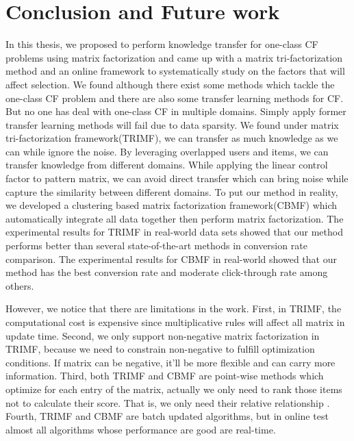 \chapter{Conclusion and Future work}
\label{chp:conclusion}

In this thesis, we proposed to perform knowledge transfer for one-class CF problems using matrix factorization and came up with a matrix tri-factorization method and an online framework to systematically study on the factors that will affect selection.
We found although there exist some methods which tackle the one-class CF problem and there are also some transfer learning methods for CF. But no one has deal with one-class CF in multiple domains. Simply apply former transfer learning methods will fail due to data sparsity. 
We found under matrix tri-factorization framework(TRIMF), we can transfer as much knowledge as we can while ignore the noise. 
By leveraging overlapped users and items, we can transfer knowledge from different domains. While applying the linear control factor to pattern matrix, we can avoid direct transfer which can bring noise while capture the similarity between different domains.
To put our method in reality, we developed a clustering based matrix factorization framework(CBMF) which automatically integrate all data together then perform matrix factorization.
The experimental results for TRIMF in real-world data sets showed that our method performs better than several state-of-the-art methods in conversion rate comparison.
The experimental results for CBMF in real-world showed that our method has the best conversion rate and moderate click-through rate among others.
 
However, we notice that there are limitations in the work. First, in TRIMF, the computational cost is expensive since multiplicative rules will affect all matrix in update time. Second, we only support non-negative matrix factorization in TRIMF, because we need to constrain non-negative to fulfill optimization conditions. If matrix can be negative, it'll be more flexible and can carry more information. Third, both TRIMF and CBMF are point-wise methods which optimize for each entry of the matrix, actually we only need to rank those items not to calculate their score. That is, we only need their relative relationship \cite{Rendle:2009:BBP:1795114.1795167}. Fourth, TRIMF and CBMF are batch updated algorithms, but in online test almost all algorithms whose performance are good are real-time.


